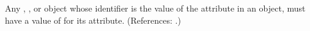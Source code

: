 Any \Compartment, \Species, \Parameter or \SpeciesReference object whose
identifier is the value of the attribute  in an
\AssignmentRule object, must have a value of  for its
 attribute.  (References: .)
